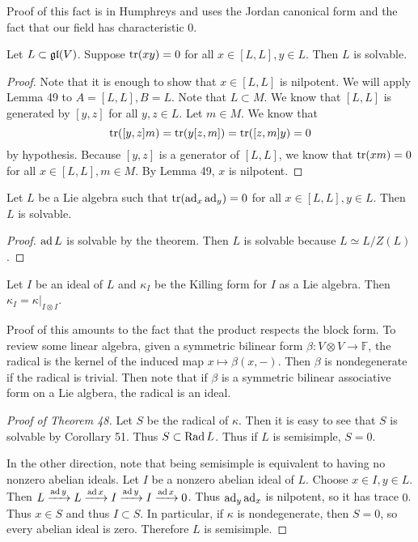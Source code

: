 \documentclass[twoside, 10pt]{article}
\newcommand{\F}{\mathbb{F}}
\begin{document}
    Proof of this fact is in Humphreys and uses the Jordan canonical form and
    the fact that our field has characteristic $0$.
    
    \begin{thm} Let $L \subset \mathfrak{gl}(V)$. Suppose
    $\operatorname{tr}(xy) = 0$ for all $x \in [L,L], y \in L$. Then $L$ is solvable.
\end{thm}

    \begin{proof} Note that it is enough to show that $x \in [L,L]$ is
        nilpotent. We will apply Lemma 49 to $A = [L,L], B = L$. Note that $L
        \subset M$. We know that $[L,L]$ is generated by $[y,z]$ for all $y,z
        \in L$. Let $m \in M$. We know that \[ \operatorname{tr}([y,z]m) = \operatorname{tr}(y[z,m]) =
        \operatorname{tr}([z,m]y) = 0\] by hypothesis. Because $[y,z]$ is a generator of
        $[L,L]$, we know that $\operatorname{tr}(xm) = 0$ for all $x \in [L,L], m \in M$. By
        Lemma 49, $x$ is nilpotent.  \end{proof}

    \begin{cor} Let $L$ be a Lie algebra such that $\operatorname{tr}(\operatorname{ad}_x \operatorname{ad}_y) = 0$ for
    all $x \in [L,L], y \in L$. Then $L$ is solvable.  \end{cor}

    \begin{proof} $\operatorname{ad} L$ is solvable by the theorem. Then $L$ is solvable
    because $L \simeq L/Z(L)$.  \end{proof}
    
    \begin{lem} Let $I$ be an ideal of $L$ and $\kappa_I$ be the Killing form
    for $I$ as a Lie algebra. Then $\kappa_I = \kappa|_{I \otimes I}$.
\end{lem}

    Proof of this amounts to the fact that the product respects the block form.
    To review some linear algebra, given a symmetric bilinear form $\beta:V
    \otimes V \to \F$, the radical is the kernel of the induced map $x \mapsto
    \beta(x,-)$. Then $\beta$ is nondegenerate if the radical is trivial. Then
    note that if $\beta$ is a symmetric bilinear associative form on a Lie
    algbera, the radical is an ideal.

    \begin{proof}[Proof of Theorem 48] Let $S$ be the radical of $\kappa$. Then
        it is easy to see that $S$ is solvable by Corollary 51. Thus $S \subset
        \operatorname{Rad} L$. Thus if $L$ is semisimple, $S = 0$.

        In the other direction, note that being semisimple is equivalent to
    having no nonzero abelian ideals. Let $I$ be a nonzero abelian ideal of
$L$. Choose $x \in I, y \in L$. Then $L \xrightarrow{\operatorname{ad} y} L \xrightarrow{\operatorname{ad}
x} I \xrightarrow{\operatorname{ad} y} I \xrightarrow{\operatorname{ad} x} 0$. Thus $\operatorname{ad}_y \operatorname{ad}_x$ is
nilpotent, so it has trace $0$. Thus $x \in S$ and thus $I \subset S$. In
particular, if $\kappa$ is nondegenerate, then $S = 0$, so every abelian ideal
is zero. Therefore $L$ is semisimple.  \end{proof}
\end{document}
